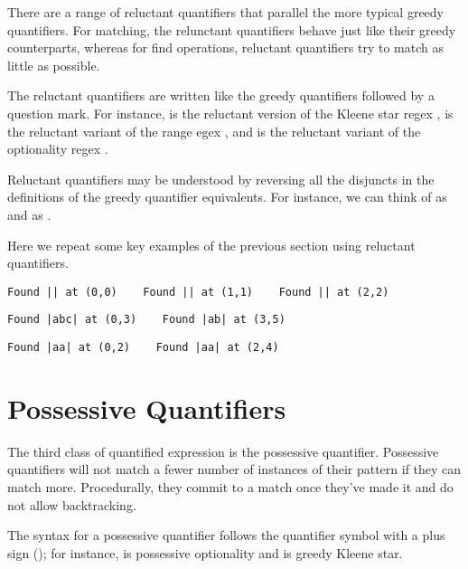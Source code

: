 There are a range of reluctant quantifiers that parallel the more
typical greedy quantifiers.  For matching, the relunctant quantifiers
behave just like their greedy counterparts, whereas for find
operations, reluctant quantifiers try to match as little as possible.

The reluctant quantifiers are written like the greedy quantifiers
followed by a question mark.  For instance,   is
the reluctant version of the Kleene star regex ,
 is the reluctant variant of the range egex
, and  is the reluctant
variant of the optionality regex .

Reluctant quantifiers may be understood by reversing all the disjuncts
in the definitions of the greedy quantifier equivalents.  For
instance, we can think of  as
 and  as
. 

Here we repeat some key examples of the previous section using reluctant
quantifiers.
%
\begin{verbatim}
Found || at (0,0)    Found || at (1,1)    Found || at (2,2)
\end{verbatim}
%
\begin{verbatim}
Found |abc| at (0,3)    Found |ab| at (3,5)
\end{verbatim}
%
\begin{verbatim}
Found |aa| at (0,2)    Found |aa| at (2,4)
\end{verbatim}
%


\section{Possessive Quantifiers}

The third class of quantified expression is the possessive quantifier.
Possessive quantifiers will not match a fewer number of instances of
their pattern if they can match more.  Procedurally, they commit to
a match once they've made it and do not allow backtracking.

The syntax for a possessive quantifier follows the quantifier symbol
with a plus sign (\code{+}); for instance,  is possessive
optionality and \code{*+} is greedy Kleene star.

